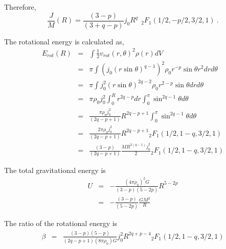 Therefore, 
\begin{equation}
\frac{J}{M}(R) = \frac{(3-p)}{(3+q-p)} j_0 R^{q} ~~
_2F_1(1/2, -p/2, 3/2, 1) ~.
\end{equation}

The rotational energy is calculated as,
\begin{eqnarray}
E_{rot}(R) &=& \int \frac{1}{2} v_{rot} (r,\theta)^2 \rho(r) dV \\
&=& \pi \int \left(j_0 (r \sin \theta)^{q-1}\right)^2 \rho_0 r^{-p} \sin\theta r^2 dr d\theta \nonumber\\
&=& \pi  \int j_0^2 (r \sin \theta)^{2q-2} \rho_0 r^{2-p} \sin\theta dr d\theta  \nonumber\\
&=& \pi \rho_0  j_0^2 
\int_0^R  r ^{2q-p}  dr 
\int_0^\pi  \sin^{2q-1} \theta  d\theta  \nonumber\\
&=& 
\frac{\pi \rho_0  j_0^2 }{(2q-p+1)} R^{2q-p+1}
\int_0^\pi  \sin^{2q-1} \theta  d\theta   \nonumber\\
&=& 
\frac{2\pi \rho_0  j_0^2 }{(2q-p+1)} R^{2q-p+1}
{}_2F_1(1/2, 1-q, 3/2, 1) \\
&=& 
\frac{(3-p)}{(2q-p+1)} \frac{M R^{2(q-1)}  j_0^2 }{2}
{}_2F_1(1/2, 1-q, 3/2, 1)
\end{eqnarray}

The total gravitational energy is 
\begin{eqnarray}
U &=& -\frac{(4\pi\rho_0)^2 G}{(3-p)(5-2p)} R^{5-2p}\\
&=& -\frac{(3-p)}{(5-2p)}\frac{G M^2}{R}
\end{eqnarray}

The ratio of the rotational energy is
\begin{eqnarray}
\beta &=& \frac{(3-p)(5-p)}{(2q-p+1)(8\pi \rho_0)G} j_0^2 R^{2q+p-4} {}_2F_1(1/2, 1-q, 3/2, 1)
\end{eqnarray}